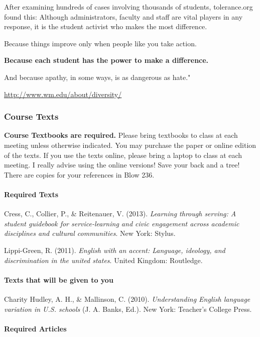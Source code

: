 \documentclass[]{article}
\let\oldparagraph\paragraph
\renewcommand{\paragraph}[1]{\oldparagraph{#1}\mbox{}}
\begin{document}
After examining hundreds of cases involving thousands of students,
tolerance.org found this: Although administrators, faculty and staff are
vital players in any response, it is the student activist who makes the
most difference.

Because things improve only when people like you take action.

\textbf{Because each student has the power to make a difference.}

And because apathy, in some ways, is as dangerous as hate."

\url{http://www.wm.edu/about/diversity/}

\subsubsection{Course Texts}\label{course-texts}

\textbf{Course Textbooks are required.} Please bring textbooks to class
at each meeting unless otherwise indicated. You may purchase the paper
or online edition of the texts. If you use the texts online, please
bring a laptop to class at each meeting. I really advise using the
online versions! Save your back and a tree! There are copies for your
references in Blow 236.

\paragraph{Required Texts}\label{required-texts}

Cress, C., Collier, P., \& Reitenauer, V. (2013). \emph{Learning through serving: A student guidebook for service-learning and civic engagement across academic disciplines and cultural communities}. New York: Stylus.

Lippi-Green, R. (2011). \emph{English with an accent: Language, ideology, and discrimination in the united states}. United Kingdom: Routledge.

\paragraph{Texts that will be given to
you}\label{texts-that-will-be-given-to-you}

Charity Hudley, A. H., \& Mallinson, C. (2010). \emph{Understanding English language variation in U.S. schools} (J. A. Banks, Ed.). New York: Teacher’s College Press.

\paragraph{Required Articles}\label{required-articles}
\end{document}
